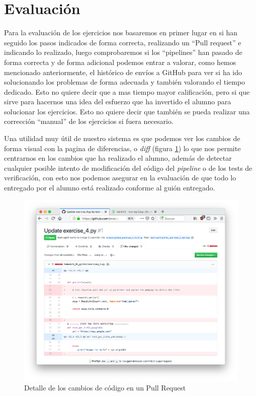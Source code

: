 \section{Evaluación}

Para la evaluación de los ejercicios nos basaremos en primer lugar en si han seguido los pasos indicados de forma correcta, realizando un ``Pull request'' e indicando lo realizado, luego comprobaremos si los ``pipelines'' han pasado de forma correcta y de forma adicional podemos entrar a valorar, como hemos mencionado anteriormente, el histórico de envíos a GitHub para ver si ha ido solucionando los problemas de forma adecuada y también valorando el tiempo dedicado. Esto no quiere decir que a mas tiempo mayor calificación, pero si que sirve para hacernos una idea del esfuerzo que ha invertido el alumno para solucionar los ejercicios. Esto no quiere decir que también se pueda realizar una corrección ``manual'' de los ejercicios si fuera necesario.

\bigskip
Una utilidad muy útil de nuestro sistema es que podemos ver los cambios de forma visual con la pagina de diferencias, o \textit{diff} (figura \ref{fig:github_pr_diff}) lo que nos permite centrarnos en los cambios que ha realizado el alumno, además de detectar cualquier posible intento de modificación del código del \textit{pipeline} o de los tests de verificación, con esto nos podemos asegurar en la evaluación de que todo lo entregado por el alumno está realizado conforme al guión entregado.

\begin{figure}[h!]
\centering
\includegraphics[width=1.0\textwidth]{../images/github_pr_diff}
\caption{Detalle de los cambios de código en un Pull Request}
\label{fig:github_pr_diff}
\end{figure}






